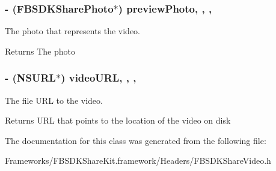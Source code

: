 \subsubsection[{preview\+Photo}]{\setlength{\rightskip}{0pt plus 5cm}-\/ ({\bf F\+B\+S\+D\+K\+Share\+Photo}$\ast$) preview\+Photo\hspace{0.3cm}{\ttfamily [read]}, {\ttfamily [write]}, {\ttfamily [nonatomic]}, {\ttfamily [copy]}}\label{interface_f_b_s_d_k_share_video_a7f5d79a8e18478aa5a5b385dbe81c036}
The photo that represents the video. \begin{DoxyReturn}{Returns}
The photo 
\end{DoxyReturn}
\hypertarget{interface_f_b_s_d_k_share_video_afdccd7554a53514993ba881300edecc5}{}
\subsubsection[{video\+U\+R\+L}]{\setlength{\rightskip}{0pt plus 5cm}-\/ (N\+S\+U\+R\+L$\ast$) video\+U\+R\+L\hspace{0.3cm}{\ttfamily [read]}, {\ttfamily [write]}, {\ttfamily [nonatomic]}, {\ttfamily [copy]}}\label{interface_f_b_s_d_k_share_video_afdccd7554a53514993ba881300edecc5}
The file U\+R\+L to the video. \begin{DoxyReturn}{Returns}
U\+R\+L that points to the location of the video on disk 
\end{DoxyReturn}


The documentation for this class was generated from the following file\+:\begin{DoxyCompactItemize}
\item 
Frameworks/\+F\+B\+S\+D\+K\+Share\+Kit.\+framework/\+Headers/F\+B\+S\+D\+K\+Share\+Video.\+h\end{DoxyCompactItemize}
